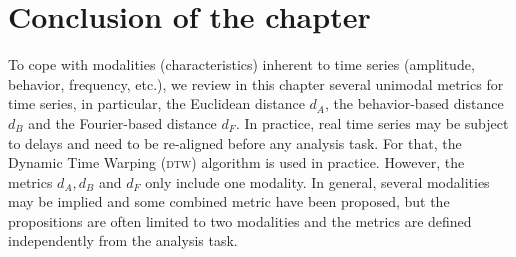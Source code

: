 %
%
%
%
%




\newpage
\section{Conclusion of the chapter}
To cope with modalities (characteristics) inherent to time series (amplitude, behavior, frequency, etc.), we review in this chapter several unimodal metrics for time series, in particular, the Euclidean distance $d_A$, the behavior-based distance $d_B$ and the Fourier-based distance $d_F$. 
In practice, real time series may be subject to delays and need to be re-aligned before any analysis task. For that, the Dynamic Time Warping (\textsc{dtw}) algorithm is used in practice. 
However, the metrics $d_A, d_B$ and $d_F$ only include one modality. In general, several modalities may be implied and some combined metric have been proposed, but the propositions are often limited to two modalities and the metrics are defined independently from the analysis task. 

